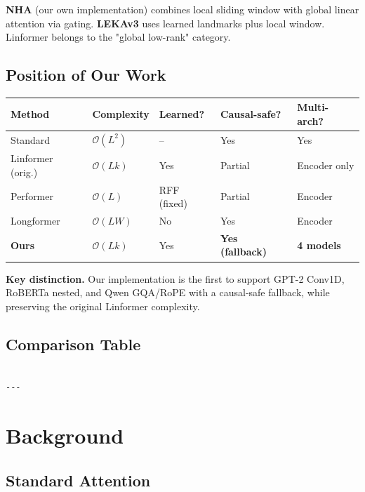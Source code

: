 \textbf{NHA} (our own implementation) combines local sliding window with global 
linear attention via gating. \textbf{LEKAv3} uses learned landmarks plus local 
window. Linformer belongs to the "global low-rank" category.

\subsection{Position of Our Work}

\begin{table}[H]
\centering
\small
\begin{tabular}{lllll}
\toprule
\textbf{Method} & \textbf{Complexity} & \textbf{Learned?} & \textbf{Causal-safe?} & \textbf{Multi-arch?} \\
\midrule
Standard & $\mathcal{O}(L^2)$ & -- & Yes & Yes \\
Linformer (orig.) & $\mathcal{O}(L k)$ & Yes & Partial & Encoder only \\
Performer & $\mathcal{O}(L)$ & RFF (fixed) & Partial & Encoder \\
Longformer & $\mathcal{O}(L W)$ & No & Yes & Encoder \\
\textbf{Ours} & $\mathcal{O}(L k)$ & Yes & \textbf{Yes (fallback)} & \textbf{4 models} \\
\bottomrule
\end{tabular}
\end{table}

\textbf{Key distinction.} Our implementation is the first to support GPT-2 
Conv1D, RoBERTa nested, and Qwen GQA/RoPE with a causal-safe fallback, 
while preserving the original Linformer complexity.



\subsection{Comparison Table}

\begin{lstlisting}

---
\end{lstlisting}

\section{Background}

\subsection{Standard Attention}

